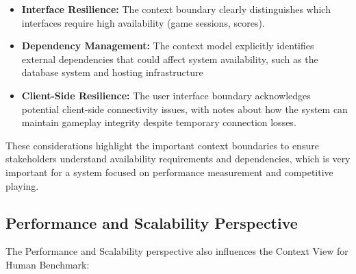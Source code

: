 \begin{itemize}
    \item \textbf{Interface Resilience:} The context boundary clearly
          distinguishes which interfaces require high availability (game sessions,
          scores).

    \item \textbf{Dependency Management:} The context model explicitly
          identifies external dependencies that could affect system availability, such
          as the database system and hosting infrastructure


    \item \textbf{Client-Side Resilience:} The user interface boundary acknowledges potential client-side connectivity issues, with notes about how the system can maintain gameplay integrity despite temporary connection losses.
\end{itemize}

These considerations highlight the important context boundaries to ensure
stakeholders understand availability requirements and dependencies, which is
very important for a system focused on performance measurement and
competitive playing.

\subsection{Performance and Scalability Perspective}


The Performance and Scalability perspective also influences the Context View for
Human Benchmark:


